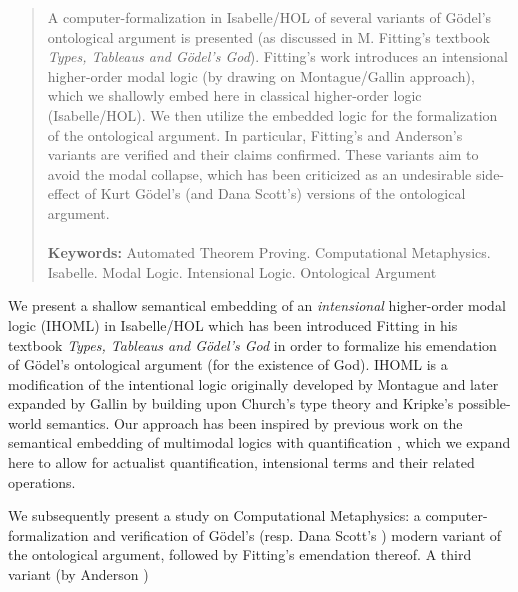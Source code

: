 %
\begin{isabellebody}%
%
%
%
%
%
%
%
%
\begin{isamarkuptext}%
\begin{abstract}
	A computer-formalization in Isabelle/HOL of several variants of G\"odel's ontological argument is presented
	(as discussed in M. Fitting's textbook \emph{Types, Tableaus and G\"odel's God}). Fitting's work
	introduces an intensional higher-order modal logic (by drawing on Montague/Gallin approach), which we
	shallowly embed here in classical higher-order logic (Isabelle/HOL). We then	utilize the embedded logic for the
  formalization of the ontological argument. In particular, Fitting's and Anderson's variants are verified
  and their claims confirmed. These variants aim to avoid the modal collapse, which has been criticized as
  an undesirable side-effect of Kurt G\"odel's (and Dana Scott's) versions of the ontological argument.
  \\ \\
  \textbf{Keywords:} Automated Theorem Proving. Computational Metaphysics. Isabelle. Modal Logic.
	Intensional Logic. Ontological Argument
\end{abstract}%
\end{isamarkuptext}\isamarkuptrue%
%
\isamarkuptrue%
%
\begin{isamarkuptext}%
We present a shallow semantical embedding of an \emph{intensional} higher-order modal logic (IHOML) in Isabelle/HOL
which has been introduced Fitting in his textbook \emph{Types, Tableaus and G\"odel's God} \cite{Fitting} in order
to formalize his emendation of G\"odel's ontological argument (for the existence of God). IHOML is a modification of the
intentional logic originally developed by Montague and later expanded by Gallin \cite{Gallin75} by building upon Church's
type theory and Kripke's possible-world semantics. Our approach has been inspired by previous work on the semantical embedding of
multimodal logics with quantification \cite{J23}, which we expand here to allow for actualist quantification,
intensional terms and their related operations.%
\end{isamarkuptext}\isamarkuptrue%
%
\begin{isamarkuptext}%
We subsequently present a study on Computational Metaphysics: a computer-formalization and verification
of G\"odel's \cite{GoedelNotes} (resp. Dana Scott's \cite{ScottNotes}) modern variant of the ontological argument,
followed by Fitting's emendation thereof. A third variant (by Anderson \cite{anderson90:_some_emend_of_goedel_ontol_proof})

\end{isamarkuptext}
\end{isabellebody}
